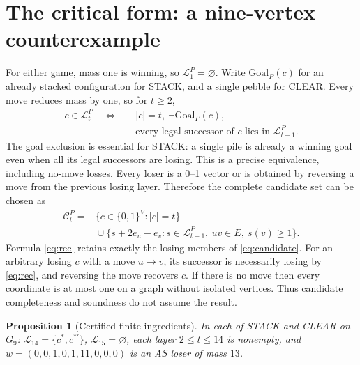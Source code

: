 \documentclass[10pt,a4paper]{article}
\newtheorem{proposition}{Proposition}[section]
\begin{document}
\section{The critical form: a nine-vertex counterexample}
For either game, mass one is winning, so \(\mathcal{L}_1^P=\varnothing\).
Write \(\mathrm{Goal}_P(c)\) for an already stacked configuration
for STACK, and a single pebble for CLEAR. Every move reduces mass
by one, so for \(t\ge2\),
\begin{equation}\label{eq:rec}
\begin{aligned}
c\in\mathcal{L}_t^P\quad\Longleftrightarrow\quad&
 |c|=t,\ \neg\mathrm{Goal}_P(c),\\
&\text{every legal successor of }c\text{ lies in }\mathcal{L}_{t-1}^P.
\end{aligned}
\end{equation}
The goal exclusion is essential for STACK: a single pile is already
a winning goal even when all its legal successors are losing.
This is a precise equivalence, including no-move losses. Every loser is a 0--1 vector or is obtained by reversing a move from the previous losing layer. Therefore the complete candidate set can be chosen as
\begin{equation}\label{eq:candidate}
\begin{aligned}
\mathcal C_t^P={}&\{c\in\{0,1\}^{V}:|c|=t\}\\
&{}\cup\{s+2e_u-e_v:s\in\mathcal L_{t-1}^P,\ uv\in E,\ s(v)\ge1\}.
\end{aligned}
\end{equation}
Formula \eqref{eq:rec} retains exactly the losing members of \eqref{eq:candidate}. For an arbitrary losing \(c\) with a move \(u\to v\), its successor is necessarily losing by \eqref{eq:rec}, and reversing the move recovers \(c\). If there is no move then every coordinate is at most one on a graph without isolated vertices. Thus candidate completeness and soundness do not assume the result.
\begin{proposition}[Certified finite ingredients]\label{prop:cert}
In each of STACK and CLEAR on \(G_9\):
\(\mathcal L_{14}=\{c^*,c^{*\prime}\}\), \(\mathcal L_{15}=\varnothing\),
each layer \(2\le t\le14\) is nonempty, and
\(w=(0,0,1,0,1,11,0,0,0)\) is an AS loser of mass \(13\).
\end{proposition}
\end{document}
